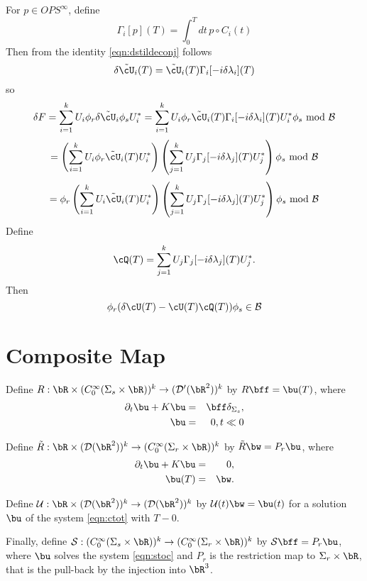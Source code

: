 For $p \in OPS^{\infty}$, define
\[
  \Gamma_i[p](T) = \int_0^T dt \, p \circ C_i(t)
\]
Then from the identity \ref{eqn:dstildeconj} follows
\[
  \delta\tilde{\cU}_i(T) = \tilde{\cU}_i(T) \Gamma_i[ -i \delta \lambda_i](T)
\] 
so
\[
  \delta F = \sum_{i=1}^k U_i \phi_r \delta \tilde{\cU}_i \phi_s U_i^*
  =\sum_{i=1}^k U_i \phi_r \tilde{\cU}_i(T) \Gamma_i[ -i \delta
  \lambda_i](T) U_i^*\phi_s
  \mbox{ mod }{\cal B}
\]
\[
  =\left(\sum_{i=1}^k U_i \phi_r \tilde{\cU}_i(T)U_i^*\right)
  \left(\sum_{j=1}^k U_j  \Gamma_j[ -i \delta \lambda_j](T) U_j^*\right)
  \phi_s   \mbox{ mod }{\cal B}
\]
\[
  =\phi_r\left(\sum_{i=1}^k U_i \tilde{\cU}_i(T)U_i^*\right)
  \left(\sum_{j=1}^k U_j  \Gamma_j[ -i \delta \lambda_j](T) U_j^*\right)
  \phi_s   \mbox{ mod }{\cal B}
\]
Define
\begin{equation}
  \label{eqn:qdef}
  \cQ(T) = \sum_{j=1}^k U_j  \Gamma_j[ -i \delta \lambda_j](T) U_j^*.
\end{equation}
Then
\begin{equation}
  \label{eqn:qident}
  \phi_r (\delta \cU(T) - \cU(T)
  \cQ(T)) \phi_s \in {\cal B}
\end{equation}

\section{Composite Map}

Define $R:\bR \times (C_0^{\infty}(\Sigma_s\times \bR))^k \rightarrow
({\cal D}'(\bR^2))^k$ by $R\bff = \bu(T)$, where
\begin{eqnarray}
  \label{eqn:stoc}
  \partial_t \bu + K \bu & = & \bff \delta_{\Sigma_s},\\
  \bu & = & 0, t \ll 0
\end{eqnarray}

Define $\tilde{R}: \bR \times ({\cal D}(\bR^2))^k \rightarrow
(C_0^{\infty}(\Sigma_r\times \bR))^k$ by $\tilde{R}\bw = P_r \bu$, where
\begin{eqnarray}
  \label{eqn:ctot}
  \partial_t \bu + K \bu & = & 0,\\
  \bu(T) & = & \bw.
\end{eqnarray}

Define ${\cal U}: \bR \times   ({\cal D}(\bR^2))^k
\rightarrow  ({\cal D}(\bR^2))^k$ by ${\cal U}(t)\bw = \bu(t)$
for a solution $\bu$ of the system \ref{eqn:ctot} with $T-0$.

Finally, define ${\cal S}: (C_0^{\infty}(\Sigma_s\times \bR))^k
\rightarrow (C_0^{\infty}(\Sigma_r\times \bR))^k$ by ${\cal S}\bff =
P_r\bu$, where $\bu$ solves the system \ref{eqn:stoc} and $P_r$ is the
restriction map to $\Sigma_r \times \bR$, that is the pull-back by the
injection into $\bR^3$.

